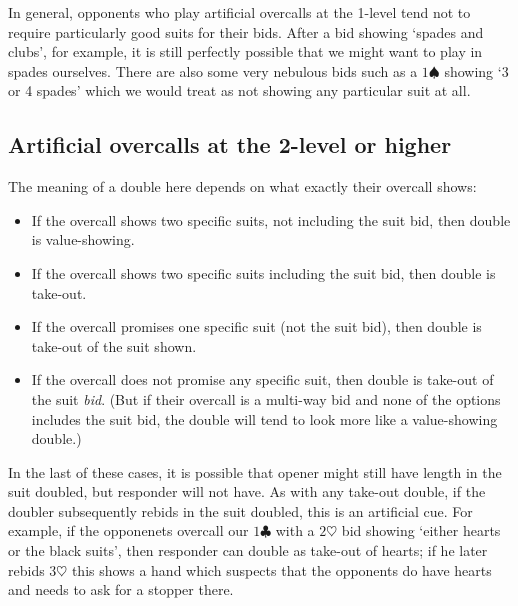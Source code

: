 \documentclass{article}
\newcommand{\sz}{\spadesuit}
\newcommand{\hz}{\heartsuit}
\newcommand{\cz}{\clubsuit}
\begin{document}
In general, opponents who play artificial overcalls at the 1-level tend not to require particularly good suits for their bids. After a bid showing `spades and clubs', for example, it is still perfectly possible that we might want to play in spades ourselves. There are also some very nebulous bids such as a $1\sz$ showing `3 or 4 spades' which we would treat as not showing any particular suit at all.

\subsection{Artificial overcalls at the 2-level or higher}

The meaning of a double here depends on what exactly their overcall shows:
\begin{itemize}
\item If the overcall shows two specific suits, not including the suit bid, then double is value-showing.
\item If the overcall shows two specific suits including the suit bid, then double is take-out.
\item If the overcall promises one specific suit (not the suit bid), then double is take-out of the suit shown.
\item If the overcall does not promise any specific suit, then double is take-out of the suit \emph{bid}. (But if their overcall is a multi-way bid and none of the options includes the suit bid, the double will tend to look more like a value-showing double.)
\end{itemize}
In the last of these cases, it is possible that opener might still have length in the suit doubled, but responder will not have. As with any take-out double, if the doubler subsequently rebids in the suit doubled, this is an artificial cue. For example, if the opponenets overcall our $1\cz$ with a $2\hz$ bid showing `either hearts or the black suits', then responder can double as take-out of hearts; if he later rebids $3\hz$ this shows a hand which suspects that the opponents do have hearts and needs to ask for a stopper there.
\end{document}
